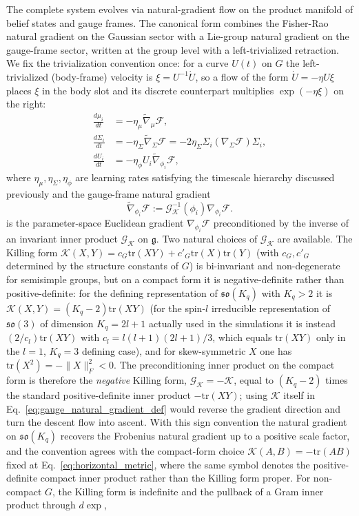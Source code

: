 \documentclass[11pt]{article}
\begin{document}
The complete system evolves via natural-gradient flow on the product manifold of belief states and gauge frames. The canonical form combines the Fisher-Rao natural gradient on the Gaussian sector with a Lie-group natural gradient on the gauge-frame sector, written at the group level with a left-trivialized retraction. We fix the trivialization convention once: for a curve $U(t)$ on $G$ the left-trivialized (body-frame) velocity is $\xi = U^{-1}\dot{U}$, so a flow of the form $\dot{U} = -\eta U \xi$ places $\xi$ in the body slot and its discrete counterpart multiplies $\exp(-\eta\xi)$ on the right:
\begin{align}
\frac{d\mu_i}{dt} &= -\eta_\mu \tilde{\nabla}_\mu \mathcal{F}, \\
\frac{d\Sigma_i}{dt} &= -\eta_\Sigma \tilde{\nabla}_\Sigma \mathcal{F} = -2\eta_\Sigma \Sigma_i (\nabla_\Sigma \mathcal{F}) \Sigma_i, \\
\frac{dU_i}{dt} &= -\eta_\phi U_i \tilde{\nabla}_{\phi_i} \mathcal{F},
\label{eq:gauge_natural_gradient}
\end{align}
where $\eta_\mu, \eta_\Sigma, \eta_\phi$ are learning rates satisfying the timescale hierarchy discussed previously and the gauge-frame natural gradient
\begin{equation}
\tilde{\nabla}_{\phi_i} \mathcal{F} := \mathcal{G}_{\mathcal{K}}^{-1}(\phi_i) \nabla_{\phi_i} \mathcal{F}.
\label{eq:gauge_natural_gradient_def}
\end{equation}
is the parameter-space Euclidean gradient $\nabla_{\phi_i}\mathcal{F}$ preconditioned by the inverse of an invariant inner product $\mathcal{G}_{\mathcal{K}}$ on $\mathfrak{g}$. Two natural choices of $\mathcal{G}_{\mathcal{K}}$ are available. The Killing form $\mathcal{K}(X,Y) = c_G \mathrm{tr}(XY) + c'_G \mathrm{tr}(X)\mathrm{tr}(Y)$ (with $c_G, c'_G$ determined by the structure constants of $G$) is bi-invariant and non-degenerate for semisimple groups, but on a compact form it is negative-definite rather than positive-definite: for the defining representation of $\mathfrak{so}(K_q)$ with $K_q > 2$ it is $\mathcal{K}(X,Y) = (K_q-2)\mathrm{tr}(XY)$ (for the spin-$l$ irreducible representation of $\mathfrak{so}(3)$ of dimension $K_q = 2l+1$ actually used in the simulations it is instead $(2/c_l)\mathrm{tr}(XY)$ with $c_l = l(l+1)(2l+1)/3$, which equals $\mathrm{tr}(XY)$ only in the $l = 1$, $K_q = 3$ defining case), and for skew-symmetric $X$ one has $\mathrm{tr}(X^2) = -\|X\|_F^2 < 0$. The preconditioning inner product on the compact form is therefore the \emph{negative} Killing form, $\mathcal{G}_{\mathcal{K}} = -\mathcal{K}$, equal to $(K_q-2)$ times the standard positive-definite inner product $-\mathrm{tr}(XY)$; using $\mathcal{K}$ itself in Eq.~\eqref{eq:gauge_natural_gradient_def} would reverse the gradient direction and turn the descent flow into ascent. With this sign convention the natural gradient on $\mathfrak{so}(K_q)$ recovers the Frobenius natural gradient up to a positive scale factor, and the convention agrees with the compact-form choice $\mathcal{K}(A,B) = -\mathrm{tr}(AB)$ fixed at Eq.~\eqref{eq:horizontal_metric}, where the same symbol denotes the positive-definite compact inner product rather than the Killing form proper. For non-compact $G$, the Killing form is indefinite and the pullback of a Gram inner product through $d\exp$,
\end{document}
